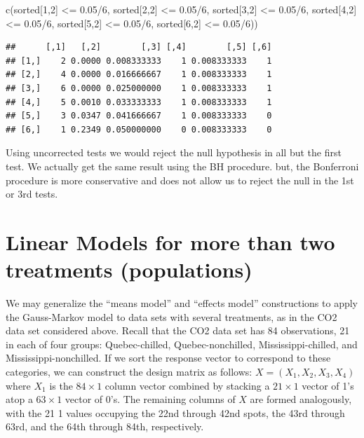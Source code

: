\documentclass[
]{book}
\newenvironment{Shaded}{\begin{snugshade}}{\end{snugshade}}
\newcommand{\DecValTok}[1]{\textcolor[rgb]{0.00,0.00,0.81}{#1}}
\newcommand{\FloatTok}[1]{\textcolor[rgb]{0.00,0.00,0.81}{#1}}
\newcommand{\FunctionTok}[1]{\textcolor[rgb]{0.00,0.00,0.00}{#1}}
\newcommand{\NormalTok}[1]{#1}
\newcommand{\SpecialCharTok}[1]{\textcolor[rgb]{0.00,0.00,0.00}{#1}}
\begin{document}
\begin{Shaded}
\begin{Highlighting}[]
      \FunctionTok{c}\NormalTok{(sorted[}\DecValTok{1}\NormalTok{,}\DecValTok{2}\NormalTok{] }\SpecialCharTok{\textless{}=} \FloatTok{0.05}\SpecialCharTok{/}\DecValTok{6}\NormalTok{, sorted[}\DecValTok{2}\NormalTok{,}\DecValTok{2}\NormalTok{] }\SpecialCharTok{\textless{}=} \FloatTok{0.05}\SpecialCharTok{/}\DecValTok{6}\NormalTok{, sorted[}\DecValTok{3}\NormalTok{,}\DecValTok{2}\NormalTok{] }\SpecialCharTok{\textless{}=} \FloatTok{0.05}\SpecialCharTok{/}\DecValTok{6}\NormalTok{, sorted[}\DecValTok{4}\NormalTok{,}\DecValTok{2}\NormalTok{] }\SpecialCharTok{\textless{}=} \FloatTok{0.05}\SpecialCharTok{/}\DecValTok{6}\NormalTok{, sorted[}\DecValTok{5}\NormalTok{,}\DecValTok{2}\NormalTok{] }\SpecialCharTok{\textless{}=} \FloatTok{0.05}\SpecialCharTok{/}\DecValTok{6}\NormalTok{, sorted[}\DecValTok{6}\NormalTok{,}\DecValTok{2}\NormalTok{] }\SpecialCharTok{\textless{}=} \FloatTok{0.05}\SpecialCharTok{/}\DecValTok{6}\NormalTok{))}
\end{Highlighting}
\end{Shaded}

\begin{verbatim}
##      [,1]   [,2]        [,3] [,4]        [,5] [,6]
## [1,]    2 0.0000 0.008333333    1 0.008333333    1
## [2,]    4 0.0000 0.016666667    1 0.008333333    1
## [3,]    6 0.0000 0.025000000    1 0.008333333    1
## [4,]    5 0.0010 0.033333333    1 0.008333333    1
## [5,]    3 0.0347 0.041666667    1 0.008333333    0
## [6,]    1 0.2349 0.050000000    0 0.008333333    0
\end{verbatim}

Using uncorrected tests we would reject the null hypothesis in all but the first test. We actually get the same result using the BH procedure. but, the Bonferroni procedure is more conservative and does not allow us to reject the null in the 1st or 3rd tests.

\hypertarget{linear-models-for-more-than-two-treatments-populations}{%
\section{Linear Models for more than two treatments (populations)}\label{linear-models-for-more-than-two-treatments-populations}}

We may generalize the ``means model'' and ``effects model'' constructions to apply the Gauss-Markov model to data sets with several treatments, as in the CO2 data set considered above. Recall that the CO2 data set has 84 observations, 21 in each of four groups: Quebec-chilled, Quebec-nonchilled, Mississippi-chilled, and Mississippi-nonchilled. If we sort the response vector to correspond to these categories, we can construct the design matrix as follows: \(X = (X_1, X_2, X_3, X_4)\) where \(X_1\) is the \(84\times 1\) column vector combined by stacking a \(21\times 1\) vector of 1's atop a \(63\times 1\) vector of 0's. The remaining columns of \(X\) are formed analogously, with the 21 1 values occupying the 22nd through 42nd spots, the 43rd through 63rd, and the 64th through 84th, respectively.
\end{document}
